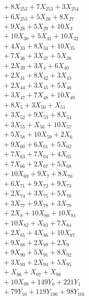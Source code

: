 \documentclass[a4paper,10pt]{article}
\begin{document}
{\begin{align}
&\quad  + 8X_{252} + 7X_{253} + 3X_{254} \\[0.5ex]
&\quad  + 6X_{255} + 5X_{26} + 8X_{27} \\[0.5ex]
&\quad  + 9X_{28} + 5X_{29} + 10X_{3} \\[0.5ex]
&\quad  + 10X_{30} + 5X_{31} + 10X_{32} \\[0.5ex]
&\quad  + 4X_{33} + 8X_{34} + 10X_{35} \\[0.5ex]
&\quad  + 7X_{36} + 3X_{37} + 5X_{38} \\[0.5ex]
&\quad  + 2X_{39} + 3X_{4} + 6X_{40} \\[0.5ex]
&\quad  + 2X_{41} + 8X_{42} + 3X_{43} \\[0.5ex]
&\quad  + 2X_{44} + 3X_{45} + 5X_{46} \\[0.5ex]
&\quad  + 3X_{47} + 7X_{48} + 10X_{49} \\[0.5ex]
&\quad  + 8X_{5} + 3X_{50} + X_{51} \\[0.5ex]
&\quad  + 3X_{52} + 9X_{53} + 8X_{54} \\[0.5ex]
&\quad  + 3X_{55} + X_{56} + 10X_{57} \\[0.5ex]
&\quad  + 5X_{58} + 10X_{59} + 2X_{6} \\[0.5ex]
&\quad  + 9X_{60} + 6X_{61} + 5X_{62} \\[0.5ex]
&\quad  + 7X_{63} + 7X_{64} + 4X_{65} \\[0.5ex]
&\quad  + 7X_{66} + 2X_{67} + 5X_{68} \\[0.5ex]
&\quad  + 10X_{69} + 9X_{7} + 8X_{70} \\[0.5ex]
&\quad  + 6X_{71} + 9X_{72} + 9X_{73} \\[0.5ex]
&\quad  + 2X_{74} + 3X_{75} + 5X_{76} \\[0.5ex]
&\quad  + 3X_{77} + 9X_{78} + 3X_{79} \\[0.5ex]
&\quad  + 2X_{8} + 10X_{80} + 10X_{81} \\[0.5ex]
&\quad  + 10X_{82} + X_{83} + 7X_{84} \\[0.5ex]
&\quad  + 2X_{85} + 4X_{86} + 10X_{87} \\[0.5ex]
&\quad  + 9X_{88} + 2X_{89} + 2X_{9} \\[0.5ex]
&\quad  + 9X_{90} + 5X_{91} + 8X_{92} \\[0.5ex]
&\quad  + 3X_{93} + 2X_{94} + 5X_{95} \\[0.5ex]
&\quad  + X_{96} + X_{97} + X_{98} \\[0.5ex]
&\quad  + 10X_{99} + 149Y_{0} + 221Y_{1} \\[0.5ex]
&\quad  + 79Y_{10} + 119Y_{100} + 98Y_{101} \\[0.5ex]

\end{align}}
\end{document}

